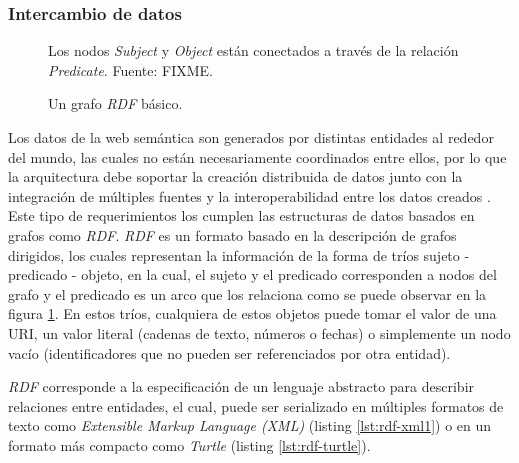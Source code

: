 \subsubsection{Intercambio de datos}

\begin{figure}
    \label{fig:rdf-graph1}
    \centering
    
    \caption{Un grafo \textit{RDF} básico.} Los nodos \textit{Subject} y \textit{Object}
    están conectados a través de la relación \textit{Predicate}. Fuente: FIXME.
\end{figure}

Los datos de la web semántica son generados por distintas entidades al rededor
del mundo, las cuales no están necesariamente coordinados entre ellos, por lo
que la arquitectura debe soportar la creación distribuida de datos junto con la
integración de múltiples fuentes y la interoperabilidad entre los datos creados
\cite{bizer2011linked}. Este tipo de requerimientos los cumplen las estructuras
de datos basados en grafos como \textit{RDF}. \textit{RDF} es un formato basado en la
descripción de grafos dirigidos, los cuales representan la información de la
forma de tríos sujeto - predicado - objeto, en la cual, el
sujeto y el predicado corresponden a nodos del grafo y el
predicado es un arco que los relaciona como se puede observar en la
figura \ref{fig:rdf-graph1}. En estos tríos, cualquiera de estos objetos puede
tomar el valor de una URI, un valor literal (cadenas de texto, números
o fechas) o simplemente un nodo vacío (identificadores que no pueden ser
referenciados por otra entidad).

\textit{RDF} corresponde a la especificación de un lenguaje abstracto para describir
relaciones entre entidades, el cual, puede ser serializado en múltiples formatos
de texto como \textit{Extensible Markup Language (XML)} \cite{beckett2004rdf}
(listing \ref{lst:rdf-xml1}) o en un formato más compacto como \textit{Turtle}
\cite{beckett2014rdf} (listing \ref{lst:rdf-turtle}).



